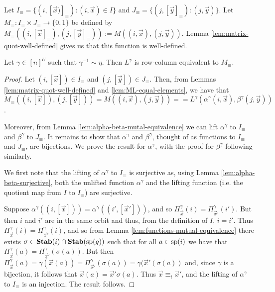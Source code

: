 \documentclass[../paper.tex]{subfiles}
\begin{document}
Let $I_{\equiv} = \{(i, [\vec{x})]_{\equiv}) : (i, \vec{x}) \in I\}$ and
$J_\equiv = \{(j, [\vec{y}]_{\equiv}) : (j, \vec{y})\}$. Let $M_{\equiv} :
I_{\equiv} \times J_{\equiv} \rightarrow \{0,1\}$ be defined by $M_\equiv ((i,
[\vec{x}]_\equiv), (j, [\vec{y}]_\equiv)) := M((i,\vec{x}), (j, \vec{y}))$.
Lemma \ref{lem:matrix-quot-well-defined} gives us that this function is
well-defined.

\begin{thm}
  Let $\gamma \in [n]^{\underline{U}}$ such that $\gamma^{-1} \sim \eta$. Then
  $L^{\gamma}$ is row-column equivalent to $M_{\equiv}$.
  \label{thm:LM-equivalence}
\end{thm}
\begin{proof}
  Let $(i, [\vec{x}]) \in I_\equiv$ and $(j, [\vec{y}]) \in J_\equiv$. Then,
  from Lemmas \ref{lem:matrix-quot-well-defined} and
  \ref{lem:ML-equal-elements}, we have that $M_\equiv ((i, [\vec{x}]), (j,
  [\vec{y}])) = M ((i, \vec{x}), (j, \vec{y}))= = L^{\gamma}(\alpha^{\gamma}(i,
  \vec{x}), \beta^{\gamma}(j, \vec{y}))$.

  Moreover, from Lemma \ref{lem:alpha-beta-mutal-equivalence} we can lift
  $\alpha^\gamma$ to $I_\equiv$ and $\beta^{\gamma}$ to $J_\equiv$. It remains
  to show that $\alpha^\gamma$ and $\beta^{\gamma}$, thought of as functions to
  $I_\equiv$ and $J_\equiv$, are bijections. We prove the result for
  $\alpha^{\gamma}$, with the proof for $\beta^\gamma$ following similarly.

  We first note that the lifting of $\alpha^{\gamma}$ to $I_\equiv$ is
  surjective as, using Lemma \ref{lem:alpha-beta-surjective}, both the unlifted
  function $\alpha^{\gamma}$ and the lifting function (i.e. the quotient map
  from $I$ to $I_\equiv$) are surjective.

  Suppose $\alpha^{\gamma}((i, [\vec{x}])) = \alpha^{\gamma}((i', [\vec{x}']))$,
  and so $\Pi^{\gamma}_{\vec{x}}(i) = \Pi^{\gamma}_{\vec{x}'}(i')$. But then $i$
  and $i'$ are in the same orbit and thus, from the definition of $I$, $i = i'$.
  Thus $\Pi^{\gamma}_{\vec{x}}(i) = \Pi^{\gamma}_{\vec{x}'}(i)$, and so from
  Lemma \ref{lem:functions-mutual-equivalence} there exists $\sigma \in \text{\textbf{Stab}}(i)
  \cap \text{\textbf{Stab}} (\text{sp} (g))$ such that for all $a \in \text{sp}(i)$ we have that
  $\Pi^{\gamma}_{\vec{x}}(a) = \Pi^{\gamma}_{\vec{x}'} (\sigma (a))$. But then
  $\Pi^{\gamma}_{\vec{x}}(a) = \gamma (\vec{x}(a)) =
  \Pi^{\gamma}_{\vec{x}'}(\sigma (a)) = \gamma (\vec{x}' (\sigma (a))$ and,
  since $\gamma$ is a bijection, it follows that $\vec{x}(a) = \vec{x}' \sigma
  (a)$. Thus $\vec{x} \equiv_i \vec{x}'$, and the lifting of $\alpha^{\gamma}$
  to $I_{\equiv}$ is an injection. The result follows.
\end{proof}
\end{document}
